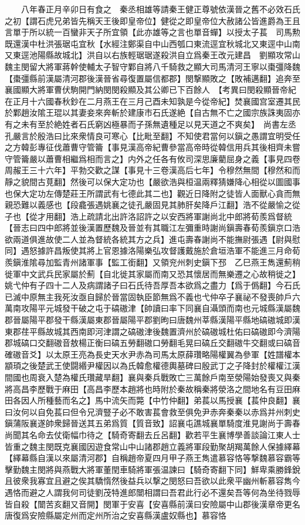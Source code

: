 　　八年春正月辛卯日有食之　秦丞相雄等請秦王健正尊號依漢晉之舊不必效石氏之初【謂石虎兄弟皆先稱天王後即皇帝位】健從之即皇帝位大赦諸公皆進爵為王且言單于所以統一百蠻非天子所宜領【此亦雄等之言也單音蟬】以授太子萇　司馬勲既還漢中杜洪張琚屯宜秋【水經注鄭渠自中山西瓠口東流逕宜秋城北又東逕中山南又東逕池陽縣故城北】洪自以右族輕琚琚遂殺洪自立爲秦王改元建昌　劉顯攻常山魏主閔留大將軍蔣幹使輔太子智守鄴自將八千騎救之顯大司馬清河王寧以棗彊降魏【棗彊縣前漢屬清河郡後漢晉省尋復置屬信都郡】閔撃顯敗之【敗補邁翻】追奔至襄國顯大將軍曹伏駒開門納閔閔殺顯及其公卿已下百餘人　【考異曰閔殺顯晉帝紀在正月十六國春秋鈔在二月燕王在三月己酉未知孰是今從帝紀】焚襄國宫室遷其民於鄴趙汝隂王琨以其妻妾來奔斬於建康市石氏遂絶【自古無不亡之國宗族誅夷固亦有之未有至於絶姓者石氏窮凶極暴而子孫無遺種足以見天道之不爽矣】　尚書左丞孔嚴言於殷浩曰比來衆情良可寒心【比毗至翻】不知使君當何以鎭之愚謂宜明受任之方韓彭專征伐蕭曹守管籥【事見漢高帝紀曹參當高帝時從韓信用兵其後相齊未嘗守管籥嚴以蕭曹相繼爲相而言之】内外之任各有攸司深思廉藺屈身之義【事見四卷周赧王三十六年】平勃交歡之謀【事見十三卷漢高后七年】令穆然無間【穆然和而靜之貌間古莧翻】然後可以保大定功也【嚴欲浩與桓温兩釋猜嫌降心相從以圖國事也保大定功左傳楚莊王所謂武有七德此其二也】觀近日降附之徒皆人面獸心貪而無親恐難以義感也【段龕張遇姚襄之徒孔嚴固見其肺肝矣降戶江翻】浩不從嚴愉之從子也【從才用翻】浩上疏請北出許洛詔許之以安西將軍謝尚北中郎將荀羨爲督統【晉志曰四中郎將並後漢置歷魏及晉並有其職江左彌重時謝尚鎭壽春荀羨鎭京口浩欲兩道俱進故使二人並為督統各統其方之兵】進屯壽春謝尚不能撫尉張遇【尉與慰同】遇怒據許昌叛使其將上官恩據洛陽樂弘攻督護戴施於倉垣浩軍不能進三月命荀羨鎭淮隂尋加監青州諸軍事【監工銜翻】又領兖州刺史鎭下邳　乙巳燕王雋還薊稍徙軍中文武兵民家屬於薊【自北徙其家屬而南又恐其懷居而無樂遷之心故稍徙之】　姚弋仲有子四十二人及病謂諸子曰石氏待吾厚吾本欲爲之盡力【爲于僞翻】今石氏已滅中原無主我死汝亟自歸於晉當固執臣節無爲不義也弋仲卒子襄祕不發喪帥戶六萬南攻陽平元城發干破之屯于碻磝津【帥讀曰率下同襄自灄頭而南也元城縣漢屬魏郡晉屬陽平郡發干縣漢屬東郡晉屬陽平郡劉昫曰唐魏州莘縣漢陽平縣地碻磝城即漢東郡荏平縣故城其西南即河津謂之碻磝津後魏置濟州於碻磝城杜佑曰碻磝即今濟陽郡城碻口交翻磝音敖楊正衡曰碻五勞翻磝口勞翻毛晃曰碻丘交翻磝牛交翻或曰碻音確磝音爻】以太原王亮為長史天水尹赤為司馬太原薛瓚略陽權翼為參軍【姓譜權本顓頊之後楚武王使闘緡尹權因以為氏韓愈權德輿墓碑曰殷武丁之子降封於權權江漢間國也周衰入楚為權氏瓚藏旱翻】襄與秦兵戰敗亡三萬餘戶南至滎陽始發喪又與秦將高昌李歷戰于麻田【高昌李歷本趙將也時附於秦故稱秦將滎洛之間地名有豆田麻田各因人所種藝而名之】馬中流矢而斃【中竹仲翻】弟萇以馬授襄【萇仲良翻】襄曰汝何以自免萇曰但令兄濟豎子必不敢害萇會救至俱免尹赤奔秦秦以赤爲并州刺史鎭蒲阪襄遂帥衆歸晉送其五弟爲質【質音致】詔襄屯譙城襄單騎度淮見謝尚于壽春尚聞其名命去仗衛幅巾待之【騎奇寄翻去丘呂翻】歡若平生襄博學善談論江東人士皆重之魏主閔既克襄國因遊食常山中山諸郡趙立義將軍段勤聚胡羯萬餘人保據繹幕【繹幕縣自漢以來屬清河郡】自稱趙帝夏四月甲子燕王雋遣慕容恪等撃魏慕容霸等擊勤魏主閔將與燕戰大將軍董閏車騎將軍張温諫曰【騎奇寄翻下同】鮮卑乘勝鋒銳且彼衆我寡宜且避之俟其驕惰然後益兵以撃之閔怒曰吾欲以此衆平幽州斬慕容雋今遇恪而避之人謂我何司徒劉茂特進郎闓相謂曰吾君此行必不還矣吾等何為坐待戮辱皆自殺【闓苦亥翻又音開】閔軍于安喜【安喜縣前漢曰安險屬中山郡後漢章帝更名唐復爲安險縣屬定州而定州所治之安喜縣漢盧奴縣也】慕容恪